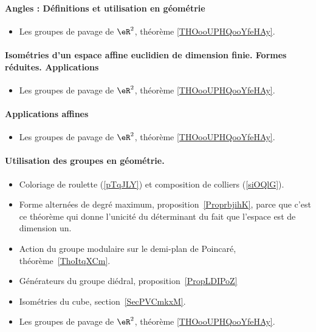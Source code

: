 \paragraph{Angles : Définitions et utilisation en géométrie}
\begin{itemize}
	\item Les groupes de pavage de \( \eR^2\), théorème \ref{THOooUPHQooYfeHAy}.
\end{itemize}
\paragraph{Isométries d'un espace affine euclidien de dimension finie. Formes réduites. Applications}
\begin{itemize}
	\item Les groupes de pavage de \( \eR^2\), théorème \ref{THOooUPHQooYfeHAy}.
\end{itemize}
\paragraph{Applications affines}
\begin{itemize}
	\item Les groupes de pavage de \( \eR^2\), théorème \ref{THOooUPHQooYfeHAy}.
\end{itemize}
\paragraph{Utilisation des groupes en géométrie.}
\begin{itemize}
	\item Coloriage de roulette (\ref{pTqJLY}) et composition de colliers (\ref{siOQlG}).
	\item Forme alternées de degré maximum, proposition~\ref{ProprbjihK}, parce que c'est ce théorème qui donne l'unicité du déterminant du fait que l'espace est de dimension un.
	\item Action du groupe modulaire sur le demi-plan de Poincaré, théorème~\ref{ThoItqXCm}.
	\item Générateurs du groupe diédral, proposition~\ref{PropLDIPoZ}
	\item Isométries du cube, section~\ref{SecPVCmkxM}.
	\item Les groupes de pavage de \( \eR^2\), théorème \ref{THOooUPHQooYfeHAy}.
\end{itemize}


